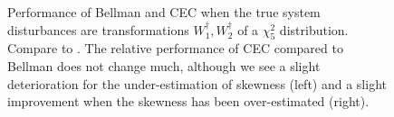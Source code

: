 \documentclass[main.tex]{subfiles}
\begin{document}
\begin{figure}[htbp]
\begin{subfigure}[b]{0.5\textwidth}
  \end{subfigure}
  \caption{Performance of Bellman and CEC when the true system disturbances
  are transformations $W_1^\dagger,W_2^\dagger$ of
  a $\chi_5^2$ distribution. Compare to
  .
  The relative performance of CEC compared to Bellman does not
  change much,
  although we see a slight deterioration for the under-estimation of
  skewness (left) and a slight improvement when the skewness has
  been over-estimated (right).
}\label{fig:markdown_bellman_mpc_chi2}
\end{figure}

\biblio
\end{document}
